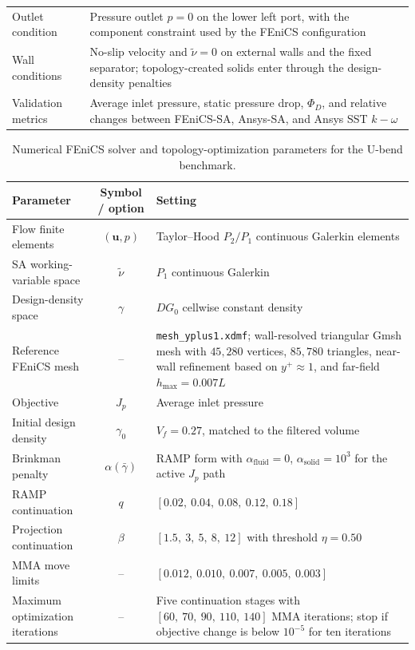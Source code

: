 \begin{table}[htbp]
\begin{tabularx}{\textwidth}{l X}
		Outlet condition & Pressure outlet $p=0$ on the lower left port, with the component constraint used by the FEniCS configuration \\
		Wall conditions & No-slip velocity and $\tilde{\nu}=0$ on external walls and the fixed separator; topology-created solids enter through the design-density penalties \\
		Validation metrics & Average inlet pressure, static pressure drop, $\Phi_D$, and relative changes between FEniCS-SA, Ansys-SA, and Ansys SST $k-\omega$ \\
		\hline
	\end{tabularx}
\end{table}

\begin{table}[htbp]
	\centering
	\footnotesize
	\caption{Numerical FEniCS solver and topology-optimization parameters for the U-bend benchmark.}
	\label{tab:app_B_alexandersen_ubend_numerical}
	\renewcommand{\arraystretch}{1.2}
	\begin{tabularx}{\textwidth}{l c X}
		\hline
		\textbf{Parameter} & \textbf{Symbol / option} & \textbf{Setting} \\
		\hline
		Flow finite elements & $(\mathbf{u},p)$ & Taylor--Hood $P_2/P_1$ continuous Galerkin elements \\
		SA working-variable space & $\tilde{\nu}$ & $P_1$ continuous Galerkin \\
		Design-density space & $\gamma$ & $DG_0$ cellwise constant density \\
		Reference FEniCS mesh & -- & \texttt{mesh\_yplus1.xdmf}; wall-resolved triangular Gmsh mesh with $45{,}280$ vertices, $85{,}780$ triangles, near-wall refinement based on $y^+\approx1$, and far-field $h_{\max}=0.007L$ \\
		Objective & $J_p$ & Average inlet pressure \\
		Initial design density & $\gamma_0$ & $V_f=0.27$, matched to the filtered volume \\
			Brinkman penalty & $\alpha(\bar{\gamma})$ & RAMP form with $\alpha_{\mathrm{fluid}}=0$, $\alpha_{\mathrm{solid}}=10^3$ for the active $J_p$ path \\
			RAMP continuation & $q$ & $[0.02,\ 0.04,\ 0.08,\ 0.12,\ 0.18]$ \\
			Projection continuation & $\beta$ & $[1.5,\ 3,\ 5,\ 8,\ 12]$ with threshold $\eta=0.50$ \\
			MMA move limits & -- & $[0.012,\ 0.010,\ 0.007,\ 0.005,\ 0.003]$ \\
			Maximum optimization iterations & -- & Five continuation stages with $[60,\ 70,\ 90,\ 110,\ 140]$ MMA iterations; stop if objective change is below $10^{-5}$ for ten iterations \\

\end{tabularx}
\end{table}
